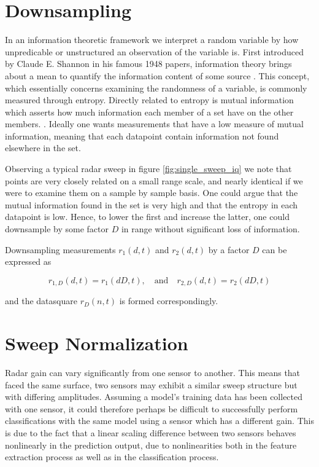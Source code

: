 \section{Downsampling}

In an information theoretic framework we interpret a random variable by how unpredicable or unstructured an observation of the variable is\citep{anderson_johnnesson_2006}. First introduced by Claude E. Shannon in his famous 1948 papers, information theory brings about a mean to quantify the information content of some source \citep{shannon_1948}. This concept, which essentially concerns examining the randomness of a variable, is commonly measured through entropy. Directly related to entropy is mutual information which asserts how much information each member of a set have on the other members. \citep{hyvasrinen_karhunen_oja_2004}. Ideally one wants measurements that have a low measure of mutual information, meaning that each datapoint contain information not found elsewhere in the set. 

Observing a typical radar sweep in figure \ref{fig:single_sweep_iq} we note that points are very closely related on a small range scale, and nearly identical if we were to examine them on a sample by sample basis. One could argue that the mutual information found in the set is very high and that the entropy in each datapoint is low. Hence, to lower the first and increase the latter, one could downsample by some factor $D$ in range without significant loss of information.

Downsampling measurements $r_1(d,t)$ and $r_2(d,t)$ by a factor $D$ can be expressed as

\begin{equation}
	r_{1,D}(d, t) = r_{1}(dD,t), 
	\quad \text{and} \quad r_{2,D}(d,t) = r_{2}(dD,t)
\end{equation}

and the datasquare $r_D(n,t)$ is formed correspondingly.

\section{Sweep Normalization}

Radar gain can vary significantly from one sensor to another. This means that faced the same surface, two sensors may exhibit a similar sweep structure but with differing amplitudes. Assuming a model's training data has been collected with one sensor, it could therefore perhaps be difficult to successfully perform classifications with the same model using a sensor which has a different gain. This is due to the fact that a linear scaling difference between two sensors behaves nonlinearly in the prediction output, due to nonlinearities both in the feature extraction process as well as in the classification process.

